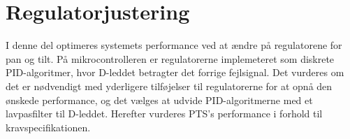 \part{Regulatorjustering}
\label{part:regulatorjustering}
I denne del optimeres systemets performance ved at ændre på regulatorene for pan og tilt. 
På mikrocontrolleren er regulatorerne implemeteret som diskrete PID-algoritmer,
hvor D-leddet betragter det forrige fejlsignal.
Det vurderes om det er nødvendigt med yderligere tilføjelser til regulatorerne 
for at opnå den ønskede performance, og det vælges at udvide PID-algoritmerne med et lavpasfilter til D-leddet.
Herefter vurderes PTS's performance i forhold til kravspecifikationen.

%
